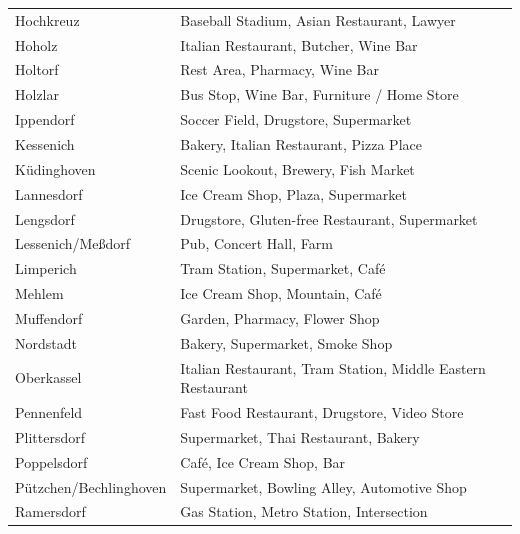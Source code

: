 \documentclass[UKenglish]{scrreprt}
\begin{document}
\begin{table}
\begin{longtable}{ll}
	Hochkreuz                           &       Baseball Stadium, Asian Restaurant, Lawyer \\
	Hoholz                              &            Italian Restaurant, Butcher, Wine Bar \\
	Holtorf                             &                    Rest Area, Pharmacy, Wine Bar \\
	Holzlar                             &       Bus Stop, Wine Bar, Furniture / Home Store \\
	Ippendorf                           &             Soccer Field, Drugstore, Supermarket \\
	Kessenich                           &          Bakery, Italian Restaurant, Pizza Place \\
	Küdinghoven                         &             Scenic Lookout, Brewery, Fish Market \\
	Lannesdorf                          &               Ice Cream Shop, Plaza, Supermarket \\
	Lengsdorf                           &   Drugstore, Gluten-free Restaurant, Supermarket \\
	Lessenich/Meßdorf                   &                          Pub, Concert Hall, Farm \\
	Limperich                           &                  Tram Station, Supermarket, Café \\
	Mehlem                              &                   Ice Cream Shop, Mountain, Café \\
	Muffendorf                          &                    Garden, Pharmacy, Flower Shop \\
	Nordstadt                           &                  Bakery, Supermarket, Smoke Shop \\
	Oberkassel                          &  Italian Restaurant, Tram Station, Middle Eastern Restaurant \\
	Pennenfeld                          &     Fast Food Restaurant, Drugstore, Video Store \\
	Plittersdorf                        &             Supermarket, Thai Restaurant, Bakery \\
	Poppelsdorf                         &                        Café, Ice Cream Shop, Bar \\
	Pützchen/Bechlinghoven              &      Supermarket, Bowling Alley, Automotive Shop \\
	Ramersdorf                          &         Gas Station, Metro Station, Intersection \\

\end{longtable}
\end{table}
\end{document}

